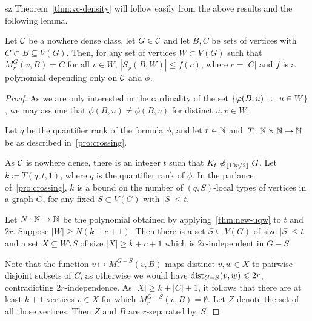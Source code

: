 \begin{change}{sz}
	Theorem~\cref{thm:vc-density} will follow easily from the above results and the following lemma.
\begin{lemma}\label{lem:num-types-same-class}
 Let $\mathcal{C}$ be a nowhere dense class,
let $G\in\mathcal{C}$ and let $B,C$ be sets of vertices with
$C\subset B\subseteq V(G)$.
Then, for any set of vertices $W\subset V(G)$ such that 
$M_r^G(v,B)=C$ for all $v\in W$, 
 $|S_\phi(B,W)|\le f(c)$, where $c=|C|$ and $f$ is a polynomial depending only on $\mathcal{C}$ and $\phi$.
\end{lemma}

\begin{proof}
As we are only interested in the cardinality of the set $\left\{\varphi(B,u) \,~:~\, u\in W \right\}$,
we may assume  that $\phi(B,u)\neq \phi(B,v)$ 
for distinct $u, v\in W$.


Let $q$ be the quantifier rank of the formula $\phi$,
and let $r\in \mathbb{N}$ and~$T\colon \mathbb{N}\times \mathbb{N}\to \mathbb{N}$  
be as described in~\cref{pro:crossing}.

As $\mathcal{C}$ is nowhere dense, there is an integer $t$ such that 
$K_t\not\preccurlyeq_{\lfloor 10r/2\rfloor} G$. 
Let $k\coloneqq T(q,t,1)$, where $q$ is the quantifier rank of $\phi$. In the parlance of~\cref{pro:crossing},
$k$ is a bound on the number of $(q,S)$-local types of vertices in a graph $G$,
for any fixed $S\subset V(G)$ with $|S|\le t$.



Let  $N\colon \mathbb{N}\to \mathbb{N}$ be the polynomial obtained by applying~\cref{thm:new-uqw} to $t$ and $2r$.
Suppose   $|W|\geq N(k+c+1)$. Then there is a  
set $S\subseteq V(G)$ of size $|S|\leq t$ 
and a set $X\subseteq W\setminus S$ of size $|X|\geq k+c+1$ which is 
$2r$-independent in $G-S$. 

Note that the function
 $v\mapsto M_r^{G-S}(v,B)$ 
 maps distinct $v,w\in X$ to pairwise disjoint subsets of $C$,
as otherwise we would have $\mathrm{dist}_{G-S}(v,w)\leqslant 2r$,
contradicting $2r$-independence.
As  $|X|\ge k+|C|+1$, it follows that 
there are at least $k+1$ vertices $v\in X$
for which ${M_r^{G-S}(v,B)=\emptyset}$. Let $Z$ denote the set of all those vertices. Then $Z$ and $B$ are $r$-separated by~$S$.



\end{proof}
\end{change}
